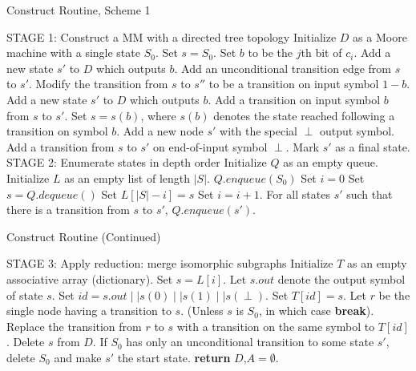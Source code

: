 \documentclass{article}
\theoremstyle{definition}
\begin{document}
\begin{algorithm}[H]
\caption{Construct Routine, Scheme 1}\label{AMMConstruct}
\begin{algorithmic}[1]
\State STAGE 1: \Comment Construct a MM with a directed tree topology
\State Initialize $D$ as a Moore machine with a single state $S_0$.
\State Set $s=S_0$.
\State Set $b$ to be the $j$th bit of $c_i$.
\State Add a new state $s'$ to $D$ which outputs $b$.
\State Add an unconditional transition edge from $s$ to $s'$.
\EndIf
{}
\State Modify the transition from $s$ to $s''$ to be a transition on 
input symbol $1-b$.
\EndIf
{}
\State Add a new state $s'$ to $D$ which outputs $b$.
\State Add a transition on input symbol $b$ from $s$ to $s'$.
\EndIf
\State Set $s=s(b)$, where $s(b)$ denotes the state reached following 
a transition on symbol $b$.
\EndFor
\State Add a new node $s'$ with the special $\perp$ output symbol.
\State Add a transition from $s$ to $s'$ on end-of-input symbol $\perp$.
\State Mark $s'$ as a final state.
\EndFor
\State STAGE 2: \Comment Enumerate states in depth order
\State Initialize $Q$ as an empty queue.
\State Initialize $L$ as an empty list of length $\lvert S \rvert$.
\State $Q.enqueue(S_0)$
\State Set $i=0$
\State Set $s = Q.dequeue()$
\State Set $L[\lvert S \rvert - i] = s$
\State Set $i = i + 1$.
\State For all states $s'$ such that there is a transition from $s$ to $s'$, 
$Q.enqueue(s')$.
\EndWhile
{}
\end{algorithmic}
\end{algorithm}

\begin{algorithm}[H]
\ContinuedFloat
\caption{Construct Routine (Continued)}\label{AMMConstruct}
\begin{algorithmic}
\State STAGE 3: \Comment Apply reduction: merge isomorphic subgraphs
\State Initialize $T$ as an empty associative array (dictionary).
\State Set $s=L[i]$.  Let $s.out$ denote the output symbol of state $s$.
\State Set $id=s.out\mid\mid s(0) \mid\mid s(1) \mid \mid s(\perp)$.
\State Set $T[id]=s$.
\Else
\State Let $r$ be the single node having a transition to $s$.  (Unless $s$ 
is $S_0$, in which case \textbf{break}).
\State Replace the transition from $r$ to $s$ with a transition on the 
same symbol to $T[id]$.
\State Delete $s$ from $D$.
\EndIf
\EndFor
\State If $S_0$ has only an unconditional transition to some state $s'$, 
delete $S_0$ and make $s'$ the start state.
\State \textbf{return} $D$,$A=\emptyset$.
\EndProcedure
\end{algorithmic}
\end{algorithm}
\end{document}
